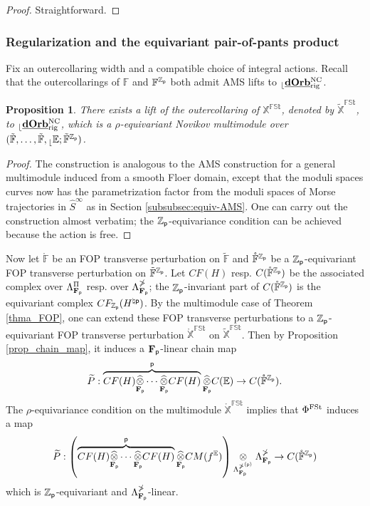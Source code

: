 \documentclass[reqno, 10pt]{amsart}
\numberwithin{equation}{section}
\numberwithin{equation}{section}
\newtheorem{prop}[thm]{Proposition}
\theoremstyle{definition}
\theoremstyle{remark}
\newcommand{\beqn}{\begin{equation*}}
\newcommand{\eeqn}{\end{equation*}}
\newcommand{\mb}{\mathbb}
\newcommand{\p}{{\sf p}}
\newcommand{\fp}{{\bf F}_{\sf p}}
\newcommand{\zp}{{{\mb Z}_{\sf p}}}
\newcommand{\ep}{{{\mathbb E}}}
\renewcommand{\outer}{{}_{\lfloor}}
\newcommand{\wt}{\widetilde}
\newcommand{\wh}{\widehat}
\newcommand{\uds}[1]{\underline{\smash{#1}}}
\begin{document}
\begin{proof}
Straightforward.
\end{proof}




\subsubsection{Regularization and the equivariant pair-of-pants product}

Fix an outercollaring width and a compatible choice of integral actions. Recall that the outercollarings of ${\mb F}$ and ${\mb F}^\zp$ both admit AMS lifts to $\outer \uds{\bf dOrb}{}_{\rm rig}^{\rm NC}$.

\begin{prop}
There exists a lift of the outercollaring of ${\mb X}^{\mb{FSt}}$, denoted by $\tilde {\mb X}^{\mb{FSt}}$, to $\outer \uds{\bf dOrb}^{\rm NC}_{\rm rig}$, which is a $\rho$-equivariant Novikov multimodule over $(\tilde {\mb F}, \ldots, \tilde {\mb F}, \outer \ep; \tilde {\mb F}^\zp)$.
\end{prop}

\begin{proof}
The construction is analogous to the AMS construction for a general multimodule induced from a smooth Floer domain, except that the moduli spaces curves now has the parametrization factor from the moduli spaces of Morse trajectories in $\wh S^{\infty}$ as in Section \ref{subsubsec:equiv-AMS}. One can carry out the construction almost verbatim; the $\zp$-equivariance condition can be achieved because the action is free.  
\end{proof}

Now let $\mathring {\mb F}$ be an FOP transverse perturbation on $\tilde{\mb F}$ and $\mathring {\mb F}^\zp$ be a $\zp$-equivariant FOP transverse perturbation on $\tilde{\mb F}^\zp$. Let $CF(H)$ resp. $C(\mathring {\mb F}^\zp)$ be the associated complex over $\Lambda_{\fp}^\Pi$ resp. over $\Lambda_{\fp}^{{\mb\Pi}}$; the $\zp$-invariant part of $C(\mathring {\mb F}^\zp)$ is the equivariant complex $CF_{\zp}(H^{\natural \p})$. By the multimodule case of Theorem \ref{thma_FOP}, one can extend these FOP transverse perturbations to a $\zp$-equivariant FOP transverse perturbation $\mathring {\mb X}^{\mb{FSt}}$ on $\tilde {\mb X}^{\mb{FSt}}$. Then by Proposition \ref{prop_chain_map}, it induces a $\fp$-linear chain map 
\beqn
\wt P: \overbrace{  CF(H) \widehat{\underset{\fp}{\otimes}} \cdots \widehat{\underset{\fp}{\otimes}} CF(H)  }^{\p} \widehat{\underset{\fp}{\otimes}} C ( \ep ) \to C(\mathring {\mb F}^\zp).
\eeqn
The $\rho$-equivariance condition on the multimodule $\mathring{\mb X}^{\mb{FSt}}$ implies that $\Phi^{\rm FSt}$ induces a map
\beqn
\wt P: \left( \overbrace{ CF(H) \widehat{\underset{\fp}{\otimes}} \cdots \widehat{\underset{\fp}{\otimes}} CF(H)  }^{\p} \widehat{\underset{\fp}{\otimes}} CM(f^\ep) \right) \underset{ \Lambda_{\fp}^{{\mb \Pi}^{(\p)}}}{\otimes} \Lambda_{\fp}^{\mb\Pi}
\to C(\mathring {\mb F}^\zp)
\eeqn
which is $\zp$-equivariant and $\Lambda_{\fp}^{\mb\Pi}$-linear.
\end{document}

